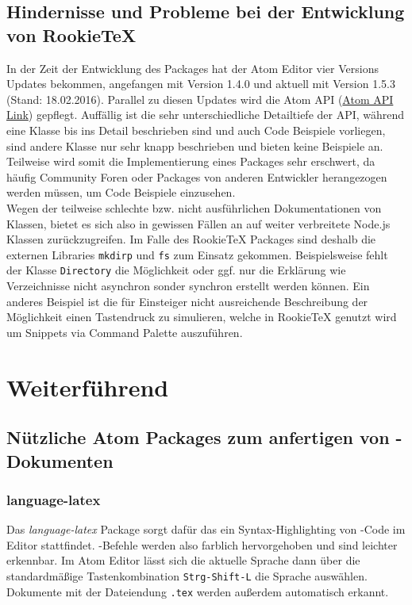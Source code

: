     \section{Hindernisse und Probleme bei der Entwicklung von RookieTeX}
        In der Zeit der Entwicklung des Packages hat der Atom Editor vier Versions Updates bekommen, angefangen mit Version 1.4.0 und aktuell mit Version 1.5.3 (Stand: 18.02.2016). Parallel zu diesen Updates wird die Atom API (\href{https://www.atom.io/docs/api/}{Atom API Link}) gepflegt. Auffällig ist die sehr unterschiedliche Detailtiefe der API, während eine Klasse bis ins Detail beschrieben sind und auch Code Beispiele vorliegen, sind andere Klasse nur sehr knapp beschrieben und bieten keine Beispiele an. Teilweise wird somit die Implementierung eines Packages sehr erschwert, da häufig Community Foren oder Packages von anderen Entwickler herangezogen werden müssen, um Code Beispiele einzusehen.
        \\
        Wegen der teilweise schlechte bzw. nicht ausführlichen Dokumentationen von Klassen, bietet es sich also in gewissen Fällen an auf weiter verbreitete Node.js Klassen zurückzugreifen. Im Falle des RookieTeX Packages sind deshalb die externen Libraries \texttt{mkdirp} und \texttt{fs} zum Einsatz gekommen. Beispielsweise fehlt der Klasse \texttt{Directory} die Möglichkeit oder ggf. nur die Erklärung wie Verzeichnisse nicht asynchron sonder synchron erstellt werden können. Ein anderes Beispiel ist die für Einsteiger nicht ausreichende Beschreibung der Möglichkeit einen Tastendruck zu simulieren, welche in RookieTeX genutzt wird um Snippets via Command Palette auszuführen.

\chapter{Weiterführend}
    \section{Nützliche Atom Packages zum anfertigen von \latex-Dokumenten}
        \subsection{language-latex}
            Das \textit{language-latex} Package sorgt dafür das ein Syntax-Highlighting von \latex-Code im Editor stattfindet. \latex-Befehle werden also farblich hervorgehoben und sind leichter erkennbar. Im Atom Editor lässt sich die aktuelle Sprache dann über die standardmäßige Tastenkombination \texttt{Strg-Shift-L} die Sprache \latex auswählen. Dokumente mit der Dateiendung \texttt{.tex} werden außerdem automatisch erkannt.
